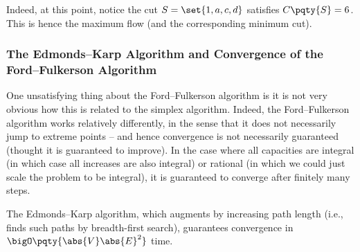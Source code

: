\begin{example}
\begin{center}
    \end{center}

    Indeed, at this point, notice the cut \(S = \set{1, a, c, d}\) satisfies \(C\pqty{S} = 6\). This is hence the maximum flow (and the corresponding minimum cut).
\end{example}

\subsubsection{The Edmonds--Karp Algorithm and Convergence of the Ford--Fulkerson Algorithm}

One unsatisfying thing about the Ford--Fulkerson algorithm is it is not very obvious how this is related to the simplex algorithm. Indeed, the Ford--Fulkerson algorithm works relatively differently, in the sense that it does not necessarily jump to extreme points -- and hence convergence is not necessarily guaranteed (thought it is guaranteed to improve). In the case where all capacities are integral (in which case all increases are also integral) or rational (in which we could just scale the problem to be integral), it is guaranteed to converge after finitely many steps.

The Edmonds--Karp algorithm, which augments by increasing path length (i.e., finds such paths by breadth-first search), guarantees convergence in \(\bigO\pqty{\abs{V} \abs{E}^2}\) time.

